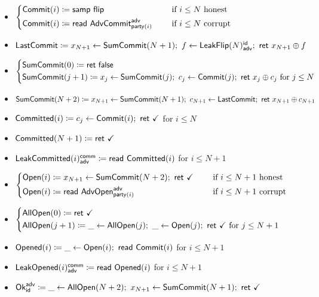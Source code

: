 \begin{itemize}
\item {\color{blue} $\begin{cases*} \Commit(i) \coloneqq \samp{\flip} & \hspace{10pt} \text{if $i \leq N$ honest} \\ \Commit(i) \coloneqq \read{\AdvCommit^\adv_{\party(i)}} & \hspace{10pt} \text{if $i \leq N$ corrupt} \end{cases*}$}
\item {\color{blue} $\LastCommit \coloneqq x_{N+1} \leftarrow \SumCommit(N+1); \ f \leftarrow \LeakFlip(N)^\id_\adv; \ \ret{x_{N+1} \oplus f}$}
\item {\color{blue} $\begin{cases*} \SumCommit(0) \coloneqq \ret{\false} \\ \SumCommit(j+1) \coloneqq x_j \leftarrow \SumCommit(j); \ c_j \leftarrow \Commit(j); \ \ret{x_j \oplus c_j} \text{ for $j \leq N$} \end{cases*}$}
\item {\color{blue} $\SumCommit(N+2) \coloneqq x_{N+1} \leftarrow \SumCommit(N+1); \ c_{N+1} \leftarrow \LastCommit; \ \ret{x_{N+1} \oplus c_{N+1}}$}
\item {\color{magenta} $\mathsf{Committed}(i) \coloneqq c_j \leftarrow \mathsf{Commit}(i); \ \mathsf{ret} \ \checkmark$ for $i \leq N$}
\item {\color{magenta} $\mathsf{Committed}(N+1) \coloneqq \mathsf{ret} \ \checkmark$}
\item {\color{magenta} $\mathsf{LeakCommitted}(i)^{\mathsf{comm}}_{\mathsf{adv}} \coloneqq \mathsf{read} \ \mathsf{Committed}(i)$ for $i \leq N+1$}
\item {\color{teal} $\begin{cases*} \Open(i) \coloneqq x_{N+1} \leftarrow \SumCommit(N+2); \ \ret{\checkmark} & \hspace{10pt} \text{if $i \leq N+1$ honest} \\ \Open(i) \coloneqq \read{\AdvOpen^\adv_{\party(i)}} & \hspace{10pt} \text{if $i \leq N+1$ corrupt} \end{cases*}$}
\item {\color{teal} $\begin{cases*} \AllOpen(0) \coloneqq \ret{\checkmark} \\ \AllOpen(j+1) \coloneqq \_ \leftarrow \AllOpen(j); \ \_ \leftarrow \Open(j); \ \ret{\checkmark} \text{ for $j \leq N+1$} \end{cases*}$}
\item {\color{red} $\mathsf{Opened}(i) \coloneqq \_ \leftarrow \mathsf{Open}(i); \ \mathsf{read} \ \mathsf{Commit}(i)$ for $i \leq N+1$}
\item {\color{red} $\mathsf{LeakOpened}(i)^{\mathsf{comm}}_{\mathsf{adv}} \coloneqq \mathsf{read} \ \mathsf{Opened}(i)$ for $i \leq N+1$}
\item $\Ok^\adv_\id \coloneqq \_ \leftarrow \AllOpen(N+2); \ x_{N+1} \leftarrow \SumCommit(N+1); \ \ret{\checkmark}$
\end{itemize}

